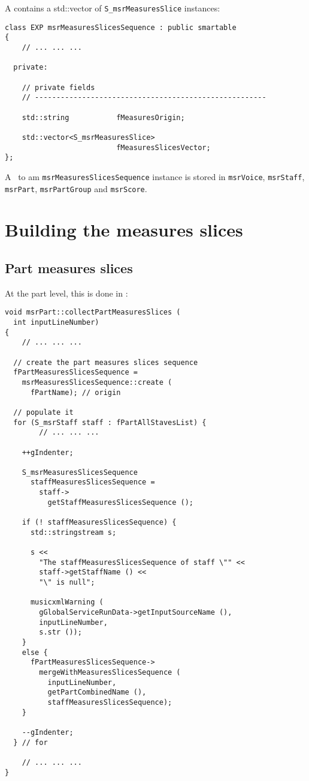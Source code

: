 A  contains a std::vector of {\tt S_msrMeasuresSlice} instances:
\begin{lstlisting}[language=CPlusPlus]
class EXP msrMeasuresSlicesSequence : public smartable
{
	// ... ... ...

  private:

    // private fields
    // ------------------------------------------------------

    std::string           fMeasuresOrigin;

    std::vector<S_msrMeasuresSlice>
                          fMeasuresSlicesVector;
};
\end{lstlisting}

A \smart\ to am {\tt msrMeasuresSlicesSequence} instance is stored in {\tt msrVoice}, {\tt msrStaff}, {\tt msrPart}, {\tt msrPartGroup} and {\tt msrScore}.


\section{Building the measures slices}

\subsection{Part measures slices}

At the part level, this is done in :
\begin{lstlisting}[language=CPlusPlus]
void msrPart::collectPartMeasuresSlices (
  int inputLineNumber)
{
	// ... ... ...

  // create the part measures slices sequence
  fPartMeasuresSlicesSequence =
    msrMeasuresSlicesSequence::create (
      fPartName); // origin

  // populate it
  for (S_msrStaff staff : fPartAllStavesList) {
		// ... ... ...

    ++gIndenter;

    S_msrMeasuresSlicesSequence
      staffMeasuresSlicesSequence =
        staff->
          getStaffMeasuresSlicesSequence ();

    if (! staffMeasuresSlicesSequence) {
      std::stringstream s;

      s <<
        "The staffMeasuresSlicesSequence of staff \"" <<
        staff->getStaffName () <<
        "\" is null";

      musicxmlWarning (
        gGlobalServiceRunData->getInputSourceName (),
        inputLineNumber,
        s.str ());
    }
    else {
      fPartMeasuresSlicesSequence->
        mergeWithMeasuresSlicesSequence (
          inputLineNumber,
          getPartCombinedName (),
          staffMeasuresSlicesSequence);
    }

    --gIndenter;
  } // for

	// ... ... ...
}
\end{lstlisting}


